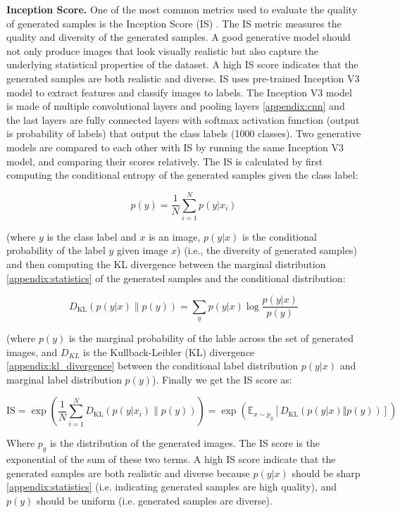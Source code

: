\textbf{Inception Score.} One of the most common metrics used to evaluate the quality of generated samples is the Inception Score (IS) \cite{is_score}. The IS metric measures the quality and diversity of the generated samples. A good generative model should not only produce images that look visually realistic but also capture the underlying statistical properties of the dataset. A high IS score indicates that the generated samples are both realistic and diverse. IS uses pre-trained Inception V3 model \cite{inception_v3_model} to extract features and classify images to labels. The Inception V3 model is made of multiple convolutional layers and pooling layers \ref{appendix:cnn} and the last layers are fully connected layers with softmax activation function (output is probability of labels) that output the class labels (1000 classes). Two generative models are compared to each other with IS by running the same Inception V3 model, and comparing their scores relatively. The IS is calculated by first computing the conditional entropy of the generated samples given the class label: 

\[
    p(y) = \frac{1}{N} \sum_{i=1}^{N} p(y|x_i)
\] 

(where $y$ is the class label and $x$ is an image, $p(y|x)$ is the conditional probability of the label $y$ given image $x$) (i.e., the diversity of generated samples) and then computing the KL divergence between the marginal distribution \ref{appendix:statistics} of the generated samples and the conditional distribution:

\[
    D_{\text{KL}}(p(y|x) \| p(y)) = \sum_{y} p(y|x) \log \frac{p(y|x)}{p(y)}
\]

(where $p(y)$ is the marginal probability of the lable across the set of generated images, and $D_{KL}$ is the Kullback-Leibler (KL) divergence \ref{appendix:kl_divergence} between the conditional label distribution $p(y|x)$ and marginal label distribution $p(y)$). Finally we get the IS score as:

\[
    \text{IS} = \exp \left( \frac{1}{N} \sum_{i=1}^{N} D_{\text{KL}}(p(y|x_i) \| p(y)) \right) = \exp(\mathbb{E}_{x \sim p_g} \left[ D_{\text{KL}} \left( p(y | x) \Vert p(y) \right) \right])
\]

Where $p_g$ is the distribution of the generated images. The IS score is the exponential of the sum of these two terms. A high IS score indicate that the generated samples are both realistic and diverse because $p(y|x)$ should be sharp \ref{appendix:statistics} (i.e. indicating generated samples are high quality), and $p(y)$ should be uniform (i.e. generated samples are diverse).






